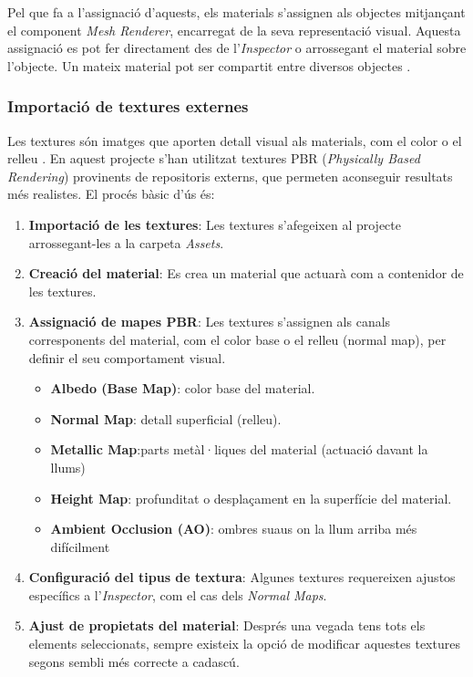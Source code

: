\documentclass[a4paper,11pt,DIV=13,headings=normal,abstract=true,twoside=semi]{article}
\begin{document}
Pel que fa a l'assignació d'aquests, els materials s'assignen als objectes mitjançant el component \textit{Mesh Renderer}, encarregat de la seva representació visual. Aquesta assignació es pot fer directament des de l'\textit{Inspector} o arrossegant el material sobre l'objecte. Un mateix material pot ser compartit entre diversos objectes \cite{UnityMaterialsReference}. 


\subsubsection{Importació de textures externes}

Les textures són imatges que aporten detall visual als materials, com el color o el relleu \cite{UnityMaterialsIntro}. En aquest projecte s'han utilitzat textures PBR (\textit{Physically Based Rendering}) provinents de repositoris externs, que permeten aconseguir resultats més realistes. El procés bàsic d'ús és:

\begin{enumerate}

\item \textbf{Importació de les textures}: Les textures s'afegeixen al projecte arrossegant-les a la carpeta \textit{Assets}. \cite{UnityImportTextures}
\item \textbf{Creació del material}: Es crea un material que actuarà com a contenidor de les textures.
\item \textbf{Assignació de mapes PBR}: Les textures s'assignen als canals corresponents del material, com el color base o el relleu (normal map), per definir el seu comportament visual.

\begin{itemize}

\item \textbf{Albedo (Base Map)}: color base del material.
\item \textbf{Normal Map}: detall superficial (relleu).  
\item \textbf{Metallic Map}:parts metàl·liques del material (actuació davant la llums)
\item \textbf{Height Map}: profunditat o desplaçament en la superfície del material.
\item \textbf{Ambient Occlusion (AO)}: ombres suaus on la llum arriba més difícilment

\end{itemize}


\item \textbf{Configuració del tipus de textura}: Algunes textures requereixen ajustos específics a l'\textit{Inspector}, com el cas dels \textit{Normal Maps}. \cite{UnityImportTextures}


\item \textbf{Ajust de propietats del material}: Després una vegada tens tots els elements seleccionats, sempre existeix la opció de modificar aquestes textures segons sembli més correcte a cadascú.

\end{enumerate}
\end{document}
